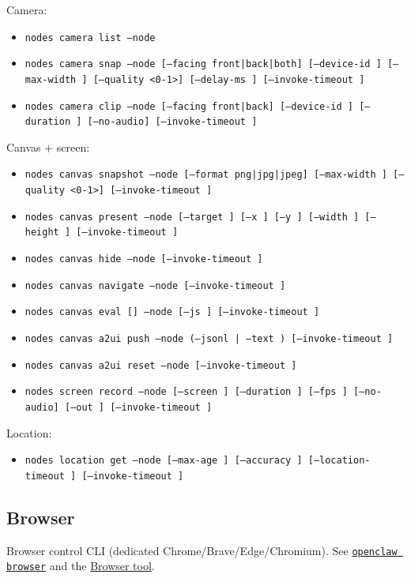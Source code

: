 Camera:

\begin{itemize}
  \item \texttt{nodes camera list --node }
  \item \texttt{nodes camera snap --node  [--facing front|back|both] [--device-id ] [--max-width ] [--quality <0-1>] [--delay-ms ] [--invoke-timeout ]}
  \item \texttt{nodes camera clip --node  [--facing front|back] [--device-id ] [--duration ] [--no-audio] [--invoke-timeout ]}
\end{itemize}


Canvas + screen:

\begin{itemize}
  \item \texttt{nodes canvas snapshot --node  [--format png|jpg|jpeg] [--max-width ] [--quality <0-1>] [--invoke-timeout ]}
  \item \texttt{nodes canvas present --node  [--target ] [--x ] [--y ] [--width ] [--height ] [--invoke-timeout ]}
  \item \texttt{nodes canvas hide --node  [--invoke-timeout ]}
  \item \texttt{nodes canvas navigate  --node  [--invoke-timeout ]}
  \item \texttt{nodes canvas eval [] --node  [--js ] [--invoke-timeout ]}
  \item \texttt{nodes canvas a2ui push --node  (--jsonl  | --text ) [--invoke-timeout ]}
  \item \texttt{nodes canvas a2ui reset --node  [--invoke-timeout ]}
  \item \texttt{nodes screen record --node  [--screen ] [--duration ] [--fps ] [--no-audio] [--out ] [--invoke-timeout ]}
\end{itemize}


Location:

\begin{itemize}
  \item \texttt{nodes location get --node  [--max-age ] [--accuracy ] [--location-timeout ] [--invoke-timeout ]}
\end{itemize}


\subsection{Browser}


Browser control CLI (dedicated Chrome/Brave/Edge/Chromium). See \href{/cli/browser}{\texttt{openclaw browser}} and the \href{/tools/browser}{Browser tool}.

